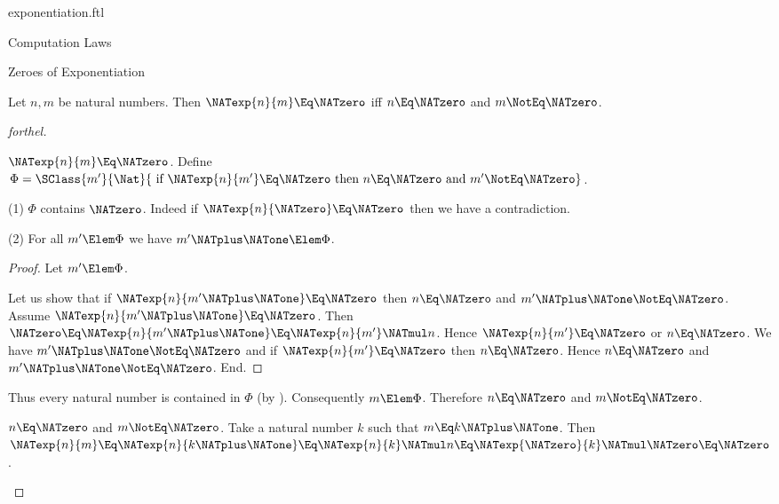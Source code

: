 \documentclass{stex}
\begin{document}
\begin{smodule}{exponentiation.ftl}
\begin{sfragment}{Computation Laws}
  \begin{sfragment}{Zeroes of Exponentiation}
    \begin{proposition}[forthel,id=ARITHMETIC_09_3860221447372800]
      Let $n, m$ be natural numbers.
      Then $\NATexp{n}{m} \Eq \NATzero$ iff $n \Eq \NATzero$ and $m \NotEq \NATzero$.
    \end{proposition}
    \begin{proof}[forthel]
      \begin{case}{$\NATexp{n}{m} \Eq \NATzero$.}
        Define $\Phi = \SClass{m'}{\Nat}{\text{ if }\NATexp{n}{m'} \Eq \NATzero\text{ then }n \Eq \NATzero\text{ and }m' \NotEq \NATzero}$.

        (1) $\Phi$ contains $\NATzero$.
        Indeed if $\NATexp{n}{\NATzero} \Eq \NATzero$ then we have a contradiction.

        (2) For all $m' \Elem \Phi$ we have $m' \NATplus \NATone \Elem \Phi$.
        \begin{proof}
          Let $m' \Elem \Phi$.

          Let us show that if $\NATexp{n}{m' \NATplus \NATone} \Eq \NATzero$ then $n \Eq \NATzero$ and $m' \NATplus \NATone \NotEq \NATzero$.
            Assume $\NATexp{n}{m' \NATplus \NATone} \Eq \NATzero$.
            Then $\NATzero \Eq \NATexp{n}{m' \NATplus \NATone} \Eq \NATexp{n}{m'} \NATmul n$.
            Hence $\NATexp{n}{m'} \Eq \NATzero$ or $n \Eq \NATzero$.
            We have $m' \NATplus \NATone \NotEq \NATzero$ and if $\NATexp{n}{m'} \Eq \NATzero$ then $n \Eq \NATzero$.
            Hence $n \Eq \NATzero$ and $m' \NATplus \NATone \NotEq \NATzero$.
          End.
        \end{proof}

        Thus every natural number is contained in $\Phi$ (by ).
        Consequently $m \Elem \Phi$.
        Therefore $n \Eq \NATzero$ and $m \NotEq \NATzero$.
      \end{case}

      \begin{case}{$n \Eq \NATzero$ and $m \NotEq \NATzero$.}
        Take a natural number $k$ such that $m \Eq k \NATplus \NATone$.
        Then $\NATexp{n}{m}
          \Eq \NATexp{n}{k \NATplus \NATone}
          \Eq \NATexp{n}{k} \NATmul n
          \Eq \NATexp{\NATzero}{k} \NATmul \NATzero
          \Eq \NATzero$.
      \end{case}
    \end{proof}
  \end{sfragment}
\end{sfragment}
\end{smodule}
\end{document}

